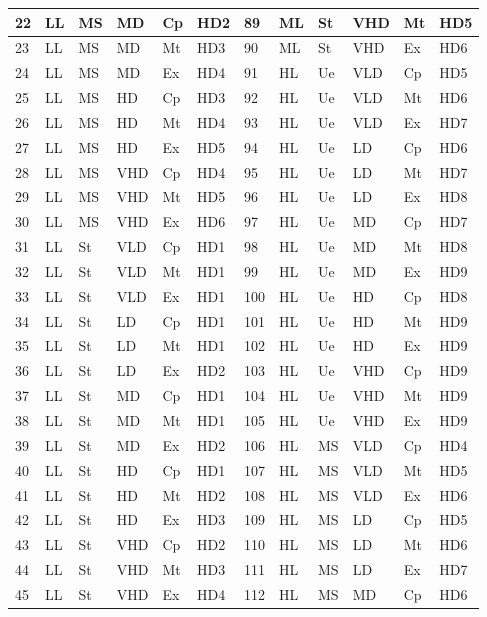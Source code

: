 \documentclass[graybox]{svmult}
\begin{document}
\begin{table}
{\begin{tabular}{ |p{1cm}|p{1cm}|p{1cm}|p{1cm}|p{1cm}|p{1cm}|p{1cm}|p{1cm}|p{1cm}|p{1cm}|p{1cm}|p{1cm}|   }
22	&	LL	&	MS	&	MD	&	Cp	&	HD2	&	89	&	ML	&	St	&	VHD	&	Mt	&	HD5	\\\hline
23	&	LL	&	MS	&	MD	&	Mt	&	HD3	&	90	&	ML	&	St	&	VHD	&	Ex	&	HD6	\\\hline
24	&	LL	&	MS	&	MD	&	Ex	&	HD4	&	91	&	HL	&	Ue	&	VLD	&	Cp	&	HD5	\\\hline
25	&	LL	&	MS	&	HD	&	Cp	&	HD3	&	92	&	HL	&	Ue	&	VLD	&	Mt	&	HD6	\\\hline
26	&	LL	&	MS	&	HD	&	Mt	&	HD4	&	93	&	HL	&	Ue	&	VLD	&	Ex	&	HD7	\\\hline
27	&	LL	&	MS	&	HD	&	Ex	&	HD5	&	94	&	HL	&	Ue	&	LD	&	Cp	&	HD6	\\\hline
28	&	LL	&	MS	&	VHD	&	Cp	&	HD4	&	95	&	HL	&	Ue	&	LD	&	Mt	&	HD7	\\\hline
29	&	LL	&	MS	&	VHD	&	Mt	&	HD5	&	96	&	HL	&	Ue	&	LD	&	Ex	&	HD8	\\\hline
30	&	LL	&	MS	&	VHD	&	Ex	&	HD6	&	97	&	HL	&	Ue	&	MD	&	Cp	&	HD7	\\\hline
31	&	LL	&	St	&	VLD	&	Cp	&	HD1	&	98	&	HL	&	Ue	&	MD	&	Mt	&	HD8	\\\hline
32	&	LL	&	St	&	VLD	&	Mt	&	HD1	&	99	&	HL	&	Ue	&	MD	&	Ex	&	HD9	\\\hline
33	&	LL	&	St	&	VLD	&	Ex	&	HD1	&	100	&	HL	&	Ue	&	HD	&	Cp	&	HD8	\\\hline
34	&	LL	&	St	&	LD	&	Cp	&	HD1	&	101	&	HL	&	Ue	&	HD	&	Mt	&	HD9	\\\hline
35	&	LL	&	St	&	LD	&	Mt	&	HD1	&	102	&	HL	&	Ue	&	HD	&	Ex	&	HD9	\\\hline
36	&	LL	&	St	&	LD	&	Ex	&	HD2	&	103	&	HL	&	Ue	&	VHD	&	Cp	&	HD9	\\\hline
37	&	LL	&	St	&	MD	&	Cp	&	HD1	&	104	&	HL	&	Ue	&	VHD	&	Mt	&	HD9	\\\hline
38	&	LL	&	St	&	MD	&	Mt	&	HD1	&	105	&	HL	&	Ue	&	VHD	&	Ex	&	HD9	\\\hline
39	&	LL	&	St	&	MD	&	Ex	&	HD2	&	106	&	HL	&	MS	&	VLD	&	Cp	&	HD4	\\\hline
40	&	LL	&	St	&	HD	&	Cp	&	HD1	&	107	&	HL	&	MS	&	VLD	&	Mt	&	HD5	\\\hline
41	&	LL	&	St	&	HD	&	Mt	&	HD2	&	108	&	HL	&	MS	&	VLD	&	Ex	&	HD6	\\\hline
42	&	LL	&	St	&	HD	&	Ex	&	HD3	&	109	&	HL	&	MS	&	LD	&	Cp	&	HD5	\\\hline
43	&	LL	&	St	&	VHD	&	Cp	&	HD2	&	110	&	HL	&	MS	&	LD	&	Mt	&	HD6	\\\hline
44	&	LL	&	St	&	VHD	&	Mt	&	HD3	&	111	&	HL	&	MS	&	LD	&	Ex	&	HD7	\\\hline
45	&	LL	&	St	&	VHD	&	Ex	&	HD4	&	112	&	HL	&	MS	&	MD	&	Cp	&	HD6	\\\hline

\end{tabular}}
\end{table}
\end{document}

